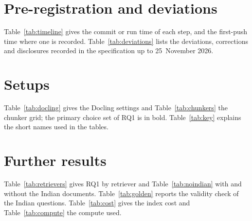 \appendices

\section{Pre-registration and deviations}\label{app:prereg}

Table~\ref{tab:timeline} gives the commit or run time of each step, and the
first-push time where one is recorded. Table~\ref{tab:deviations} lists the
deviations, corrections and disclosures recorded in the specification up to
25~November 2026.




\section{Setups}\label{app:setups}

Table~\ref{tab:docling} gives the Docling settings and
Table~\ref{tab:chunkers} the chunker grid; the primary choice set of RQ1 is
in bold. Table~\ref{tab:key} explains the short names used in the tables.





\section{Further results}\label{app:results}

Table~\ref{tab:retrievers} gives RQ1 by retriever and
Table~\ref{tab:noindian} with and without the Indian documents.
Table~\ref{tab:golden} reports the validity check of the Indian questions.
Table~\ref{tab:cost} gives the index cost and Table~\ref{tab:compute} the
compute used.





